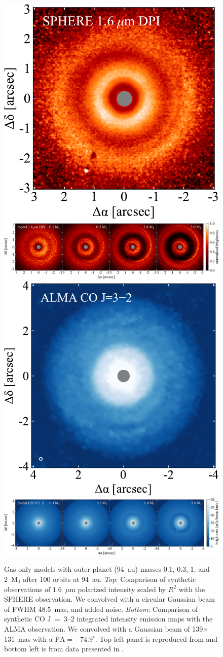 \documentclass[usenatbib,a4paper,times]{mnras}
\begin{document}
\begin{figure}
   \begin{center}
      \includegraphics[height=0.205\textwidth]{figs/van-boekel-2017.pdf} \quad
      \includegraphics[height=0.205\textwidth]{figs/scattered-image.pdf}
      \includegraphics[height=0.203\textwidth]{figs/huang-2018.pdf} \quad
      \includegraphics[height=0.203\textwidth]{figs/CO-image.pdf}
      \caption{Gas-only models with outer planet (94~au) masses 0.1, 0.3, 1, and
         2~$\mathrm{M_J}$ after 100 orbits at 94~au. \textit{Top}: Comparison of
         synthetic observations of $1.6$~$\mu$m polarized intensity scaled by
         $R^2$ with the SPHERE observation. We convolved with a circular
         Gaussian beam of FWHM $48.5$~mas, and added noise. \textit{Bottom}:
         Comparison of synthetic CO J~=~3--2 integrated intensity emission maps
         with the ALMA observation. We convolved with a Gaussian beam of
         139$\times$131~mas with a $\mathrm{PA} = -74.9^{\circ}$. Top left panel
         is reproduced from \citet{van-boekel:2017} and bottom left is from data
         presented in \citet{huang:2018}.\label{fig:scattered-CO}}
   \end{center}
\end{figure}
\end{document}

